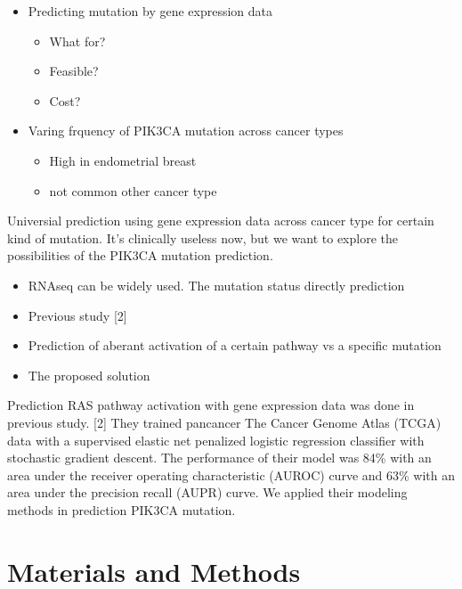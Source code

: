 \documentclass[10pt,letterpaper]{article}
\providecommand{\tightlist}{%
  \setlength{\itemsep}{0pt}\setlength{\parskip}{0pt}}
\begin{document}
\begin{itemize}
\tightlist
\item
  Predicting mutation by gene expression data

  \begin{itemize}
  \tightlist
  \item
    What for?\\
  \item
    Feasible?\\
  \item
    Cost?
  \end{itemize}
\item
  Varing frquency of PIK3CA mutation across cancer types

  \begin{itemize}
  \tightlist
  \item
    High in endometrial breast\\
  \item
    not common other cancer type
  \end{itemize}
\end{itemize}

Universial prediction using gene expression data across cancer type for
certain kind of mutation. It's clinically useless now, but we want to
explore the possibilities of the PIK3CA mutation prediction.

\begin{itemize}
\item
  RNAseq can be widely used. The mutation status directly prediction
\item
  Previous study {[}2{]}
\item
  Prediction of aberant activation of a certain pathway vs a specific
  mutation
\item
  The proposed solution
\end{itemize}

Prediction RAS pathway activation with gene expression data was done in
previous study. {[}2{]} They trained pancancer The Cancer Genome Atlas
(TCGA) data with a supervised elastic net penalized logistic regression
classifier with stochastic gradient descent. The performance of their
model was 84\% with an area under the receiver operating characteristic
(AUROC) curve and 63\% with an area under the precision recall (AUPR)
curve. We applied their modeling methods in prediction PIK3CA mutation.

\hypertarget{materials-and-methods}{%
\section{Materials and Methods}\label{materials-and-methods}}
\end{document}
